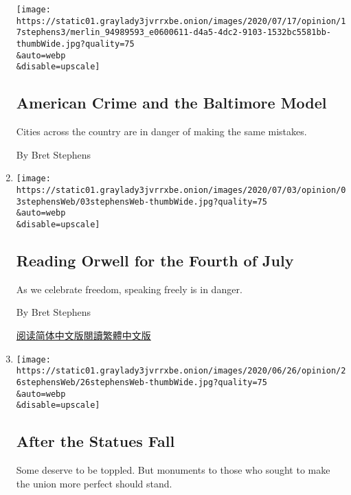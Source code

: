 \begin{enumerate}
  \texttt{[image: https://static01.graylady3jvrrxbe.onion/images/2020/07/17/opinion/17stephens3/merlin\_94989593\_e0600611-d4a5-4dc2-9103-1532bc5581bb-thumbWide.jpg?quality=75\\\&auto=webp\\\&disable=upscale]}

  \hypertarget{american-crime-and-the-baltimore-model}{%
  \subsection{American Crime and the Baltimore
  Model}\label{american-crime-and-the-baltimore-model}}

  Cities across the country are in danger of making the same mistakes.

  By Bret Stephens
\item
  \href{/2020/07/03/opinion/orwell-fourth-of-july.html}{}

  \texttt{[image: https://static01.graylady3jvrrxbe.onion/images/2020/07/03/opinion/03stephensWeb/03stephensWeb-thumbWide.jpg?quality=75\\\&auto=webp\\\&disable=upscale]}

  \hypertarget{reading-orwell-for-the-fourth-of-july}{%
  \subsection{Reading Orwell for the Fourth of
  July}\label{reading-orwell-for-the-fourth-of-july}}

  As we celebrate freedom, speaking freely is in danger.

  By Bret Stephens

  \href{https://cn.nytimes3xbfgragh.onion/opinion/20200706/orwell-fourth-of-july/}{阅读简体中文版}\href{https://cn.nytimes3xbfgragh.onion/opinion/20200706/orwell-fourth-of-july/zh-hant/}{閱讀繁體中文版}
\item
  \href{/2020/06/26/opinion/statues-protests.html}{}

  \texttt{[image: https://static01.graylady3jvrrxbe.onion/images/2020/06/26/opinion/26stephensWeb/26stephensWeb-thumbWide.jpg?quality=75\\\&auto=webp\\\&disable=upscale]}

  \hypertarget{after-the-statues-fall}{%
  \subsection{After the Statues Fall}\label{after-the-statues-fall}}

  Some deserve to be toppled. But monuments to those who sought to make
  the union more perfect should stand.


\end{enumerate}
